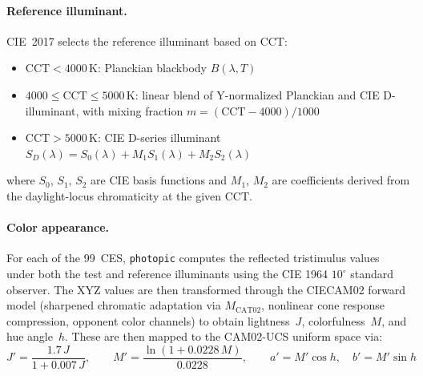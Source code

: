 \documentclass[11pt]{article}
\newcommand{\photopic}{\texttt{photopic}}
\begin{document}
\paragraph{Reference illuminant.}
CIE~2017 selects the reference illuminant based on CCT:
\begin{itemize}
  \item $\text{CCT} < 4000\,\text{K}$: Planckian blackbody $B(\lambda, T)$
  \item $4000 \leq \text{CCT} \leq 5000\,\text{K}$: linear blend of
    Y-normalized Planckian and CIE D-illuminant, with mixing fraction
    $m = (\text{CCT} - 4000)/1000$
  \item $\text{CCT} > 5000\,\text{K}$: CIE D-series illuminant
    $S_D(\lambda) = S_0(\lambda) + M_1 S_1(\lambda) + M_2 S_2(\lambda)$
\end{itemize}
where $S_0$, $S_1$, $S_2$ are CIE basis functions and $M_1$, $M_2$
are coefficients derived from the daylight-locus chromaticity at the
given CCT.

\paragraph{Color appearance.}
For each of the 99~CES, \photopic{} computes the reflected tristimulus
values under both the test and reference illuminants using the CIE 1964
$10^\circ$ standard observer.  The XYZ values are then transformed through
the CIECAM02 forward model (sharpened chromatic adaptation via $M_{\text{CAT02}}$,
nonlinear cone response compression, opponent color channels) to obtain
lightness~$J$, colorfulness~$M$, and hue angle~$h$.  These are then
mapped to the CAM02-UCS uniform space via:
\begin{equation}
  J' = \frac{1.7\,J}{1 + 0.007\,J}, \qquad
  M' = \frac{\ln(1 + 0.0228\,M)}{0.0228}, \qquad
  a' = M'\cos h, \quad b' = M'\sin h
  \label{eq:cam02ucs}
\end{equation}
\end{document}
